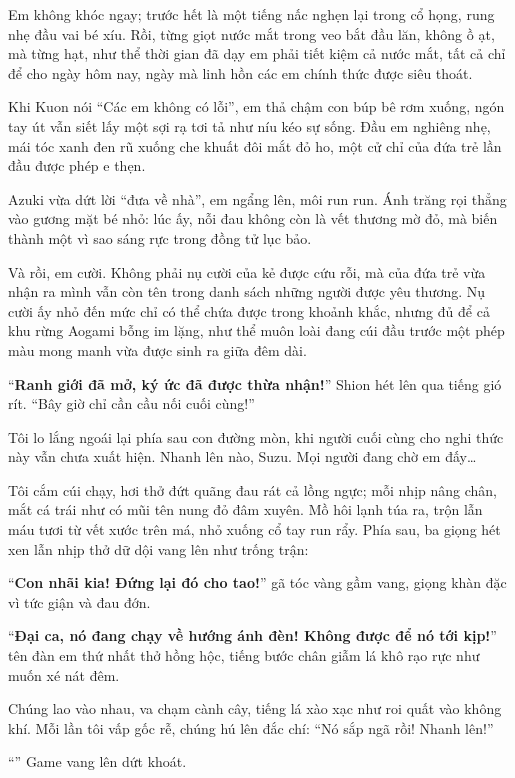 \documentclass[../main.tex]{subfiles}
\begin{document}
Em không khóc ngay; trước hết là một tiếng nấc nghẹn lại trong cổ họng, rung nhẹ đầu vai bé xíu. Rồi, từng giọt nước mắt trong veo bắt đầu lăn, không ồ ạt, mà từng hạt, như thể thời gian đã dạy em phải tiết kiệm cả nước mắt, tất cả chỉ để cho ngày hôm nay, ngày mà linh hồn các em chính thức được siêu thoát.

Khi Kuon nói ``Các em không có lỗi'', em thả chậm con búp bê rơm xuống, ngón tay út vẫn siết lấy một sợi rạ tơi tả như níu kéo sự sống. Đầu em nghiêng nhẹ, mái tóc xanh đen rũ xuống che khuất đôi mắt đỏ ho, một cử chỉ của đứa trẻ lần đầu được phép e thẹn.

Azuki vừa dứt lời ``đưa về nhà'', em ngẩng lên, môi run run. Ánh trăng rọi thẳng vào gương mặt bé nhỏ: lúc ấy, nỗi đau không còn là vết thương mờ đỏ, mà biến thành một vì sao sáng rực trong đồng tử lục bảo.

Và rồi, em cười. Không phải nụ cười của kẻ được cứu rỗi, mà của đứa trẻ vừa nhận ra mình vẫn còn tên trong danh sách những người được yêu thương. Nụ cười ấy nhỏ đến mức chỉ có thể chứa được trong khoảnh khắc, nhưng đủ để cả khu rừng Aogami bỗng im lặng, như thể muôn loài đang cúi đầu trước một phép màu mong manh vừa được sinh ra giữa đêm dài.

``\textbf{Ranh giới đã mở, ký ức đã được thừa nhận!}'' Shion hét lên qua tiếng gió rít. ``Bây giờ chỉ cần cầu nối cuối cùng!''

Tôi lo lắng ngoái lại phía sau con đường mòn, khi người cuối cùng cho nghi thức này vẫn chưa xuất hiện. Nhanh lên nào, Suzu. Mọi người đang chờ em đấy\dots


Tôi cắm cúi chạy, hơi thở đứt quãng đau rát cả lồng ngực; mỗi nhịp nâng chân, mắt cá trái như có mũi tên nung đỏ đâm xuyên. Mồ hôi lạnh túa ra, trộn lẫn máu tươi từ vết xước trên má, nhỏ xuống cổ tay run rẩy. Phía sau, ba giọng hét xen lẫn nhịp thở dữ dội vang lên như trống trận:

``\textbf{Con nhãi kia! Đứng lại đó cho tao!}'' gã tóc vàng gầm vang, giọng khàn đặc vì tức giận và đau đớn.

``\textbf{Đại ca, nó đang chạy về hướng ánh đèn! Không được để nó tới kịp!}'' tên đàn em thứ nhất thở hồng hộc, tiếng bước chân giẫm lá khô rạo rực như muốn xé nát đêm.

Chúng lao vào nhau, va chạm cành cây, tiếng lá xào xạc như roi quất vào không khí. Mỗi lần tôi vấp gốc rễ, chúng hú lên đắc chí: ``Nó sắp ngã rồi! Nhanh lên!''

``'' Game vang lên dứt khoát.
\end{document}
